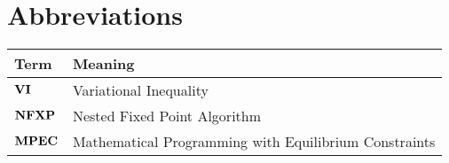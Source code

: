 

\section*{Abbreviations} %
\thispagestyle{plain} %

\phantom{This text will be invisible} 
\hspace{20cm}



\begin{table}[H]
	\centering
	\renewcommand{\arraystretch}{1.2}%
	\begin{tabular}{@{}ll@{}}
		\toprule
	Term\phantom{space}	& Meaning \\ \midrule
		$\bold{VI}$	& Variational Inequality \\
		$\bold{NFXP}$	& Nested Fixed Point Algorithm \\
		$\bold{MPEC}$	& Mathematical Programming with Equilibrium Constraints \\
 \bottomrule
	\end{tabular}
\end{table}